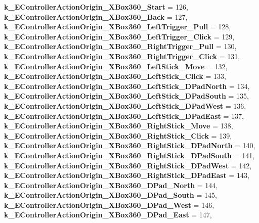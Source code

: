\begin{DoxyCompactItemize}
{\bfseries k\+\_\+\+E\+Controller\+Action\+Origin\+\_\+\+X\+Box360\+\_\+\+Start} = 126, 
{\bfseries k\+\_\+\+E\+Controller\+Action\+Origin\+\_\+\+X\+Box360\+\_\+\+Back} = 127, 
\newline
{\bfseries k\+\_\+\+E\+Controller\+Action\+Origin\+\_\+\+X\+Box360\+\_\+\+Left\+Trigger\+\_\+\+Pull} = 128, 
{\bfseries k\+\_\+\+E\+Controller\+Action\+Origin\+\_\+\+X\+Box360\+\_\+\+Left\+Trigger\+\_\+\+Click} = 129, 
{\bfseries k\+\_\+\+E\+Controller\+Action\+Origin\+\_\+\+X\+Box360\+\_\+\+Right\+Trigger\+\_\+\+Pull} = 130, 
{\bfseries k\+\_\+\+E\+Controller\+Action\+Origin\+\_\+\+X\+Box360\+\_\+\+Right\+Trigger\+\_\+\+Click} = 131, 
\newline
{\bfseries k\+\_\+\+E\+Controller\+Action\+Origin\+\_\+\+X\+Box360\+\_\+\+Left\+Stick\+\_\+\+Move} = 132, 
{\bfseries k\+\_\+\+E\+Controller\+Action\+Origin\+\_\+\+X\+Box360\+\_\+\+Left\+Stick\+\_\+\+Click} = 133, 
{\bfseries k\+\_\+\+E\+Controller\+Action\+Origin\+\_\+\+X\+Box360\+\_\+\+Left\+Stick\+\_\+\+D\+Pad\+North} = 134, 
{\bfseries k\+\_\+\+E\+Controller\+Action\+Origin\+\_\+\+X\+Box360\+\_\+\+Left\+Stick\+\_\+\+D\+Pad\+South} = 135, 
\newline
{\bfseries k\+\_\+\+E\+Controller\+Action\+Origin\+\_\+\+X\+Box360\+\_\+\+Left\+Stick\+\_\+\+D\+Pad\+West} = 136, 
{\bfseries k\+\_\+\+E\+Controller\+Action\+Origin\+\_\+\+X\+Box360\+\_\+\+Left\+Stick\+\_\+\+D\+Pad\+East} = 137, 
{\bfseries k\+\_\+\+E\+Controller\+Action\+Origin\+\_\+\+X\+Box360\+\_\+\+Right\+Stick\+\_\+\+Move} = 138, 
{\bfseries k\+\_\+\+E\+Controller\+Action\+Origin\+\_\+\+X\+Box360\+\_\+\+Right\+Stick\+\_\+\+Click} = 139, 
\newline
{\bfseries k\+\_\+\+E\+Controller\+Action\+Origin\+\_\+\+X\+Box360\+\_\+\+Right\+Stick\+\_\+\+D\+Pad\+North} = 140, 
{\bfseries k\+\_\+\+E\+Controller\+Action\+Origin\+\_\+\+X\+Box360\+\_\+\+Right\+Stick\+\_\+\+D\+Pad\+South} = 141, 
{\bfseries k\+\_\+\+E\+Controller\+Action\+Origin\+\_\+\+X\+Box360\+\_\+\+Right\+Stick\+\_\+\+D\+Pad\+West} = 142, 
{\bfseries k\+\_\+\+E\+Controller\+Action\+Origin\+\_\+\+X\+Box360\+\_\+\+Right\+Stick\+\_\+\+D\+Pad\+East} = 143, 
\newline
{\bfseries k\+\_\+\+E\+Controller\+Action\+Origin\+\_\+\+X\+Box360\+\_\+\+D\+Pad\+\_\+\+North} = 144, 
{\bfseries k\+\_\+\+E\+Controller\+Action\+Origin\+\_\+\+X\+Box360\+\_\+\+D\+Pad\+\_\+\+South} = 145, 
{\bfseries k\+\_\+\+E\+Controller\+Action\+Origin\+\_\+\+X\+Box360\+\_\+\+D\+Pad\+\_\+\+West} = 146, 
{\bfseries k\+\_\+\+E\+Controller\+Action\+Origin\+\_\+\+X\+Box360\+\_\+\+D\+Pad\+\_\+\+East} = 147, 

\end{DoxyCompactItemize}
